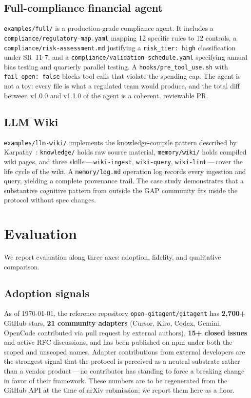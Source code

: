 \documentclass[11pt,a4paper]{article}
\begin{document}
\subsection{Full-compliance financial agent}

\texttt{examples/full/} is a production-grade compliance agent. It includes a
\texttt{compliance/regulatory-map.yaml} mapping 12 specific rules to 12 controls,
a \texttt{compliance/risk-assessment.md} justifying a \texttt{risk\_tier: high}
classification under SR~11-7, and a \texttt{compliance/validation-schedule.yaml}
specifying annual bias testing and quarterly parallel testing. A
\texttt{hooks/pre\_tool\_use.sh} with \texttt{fail\_open: false} blocks tool
calls that violate the spending cap. The agent is not a toy: every file is
what a regulated team would produce, and the total diff between v1.0.0 and
v1.1.0 of the agent is a coherent, reviewable PR.

\subsection{LLM Wiki}

\texttt{examples/llm-wiki/} implements the knowledge-compile pattern described by
Karpathy~\cite{karpathy_llmwiki}: \texttt{knowledge/} holds raw source material,
\texttt{memory/wiki/} holds compiled wiki pages, and three
skills\,---\,\texttt{wiki-ingest}, \texttt{wiki-query}, \texttt{wiki-lint}\,---\,cover
the life cycle of the wiki. A \texttt{memory/log.md} operation log records every
ingestion and query, yielding a complete provenance trail. The case study
demonstrates that a substantive cognitive pattern from outside the GAP community
fits inside the protocol without spec changes.

\section{Evaluation}\label{sec:eval}

We report evaluation along three axes: adoption, fidelity, and qualitative comparison.

\subsection{Adoption signals}

As of \today, the reference repository \texttt{open-gitagent/gitagent} has
\textbf{2{,}700+} GitHub stars, \textbf{21 community adapters} (Cursor, Kiro, Codex,
Gemini, OpenCode contributed via pull request by external authors), \textbf{15+ closed
issues} and active RFC discussions, and has been published on npm under both the
scoped and unscoped names. Adapter contributions from external developers are the
strongest signal that the protocol is perceived as a neutral substrate rather than a
vendor product\,---\,no contributor has standing to force a breaking change in favor
of their framework. These numbers are to be regenerated from the GitHub API at the
time of arXiv submission; we report them here as a floor.
\end{document}
